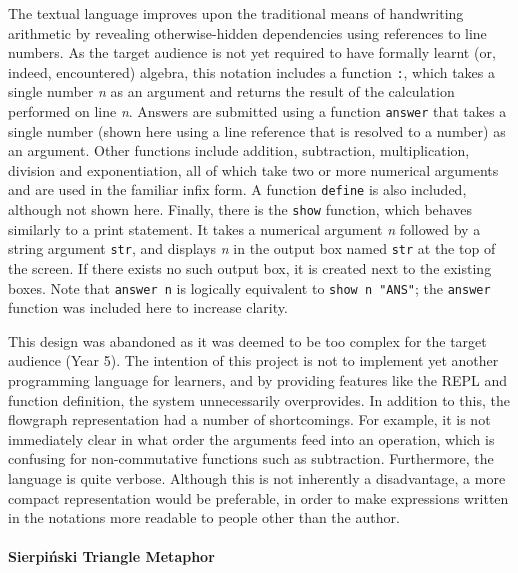 \documentclass[12pt,twoside,notitlepage,xetex]{report}
\begin{document}
The textual language improves upon the traditional means of handwriting
arithmetic by revealing otherwise-hidden dependencies using references to line
numbers.  As the target audience is not yet required to have formally learnt
(or, indeed, encountered) algebra, this notation includes a function \verb¬:¬,
which takes a single number \emph{n} as an argument and returns the result of the
calculation performed on line \emph{n}.  Answers are submitted using a function
\verb¬answer¬ that takes a single number (shown here using a line reference that
is resolved to a number) as an argument.  Other functions include addition,
subtraction, multiplication, division and exponentiation, all of which take two
or more numerical arguments and are used in the familiar infix form.  A function
\verb¬define¬ is also included, although not shown here.  Finally, there is the
\verb¬show¬ function, which behaves similarly to a print statement.  It takes a
numerical argument \emph{n} followed by a string argument \verb¬str¬, and
displays \emph{n} in the output box named \verb¬str¬ at the top of the screen.
If there exists no such output box, it is created next to the existing boxes.
Note that \verb¬answer n¬ is logically equivalent to \verb¬show n "ANS"¬; the
\verb¬answer¬ function was included here to increase clarity.

This design was abandoned as it was deemed to be too complex for the target
audience (Year 5).  The intention of this project is not to implement yet
another programming language for learners, and by providing features like the
REPL and function definition, the system unnecessarily overprovides.  In
addition to this, the flowgraph representation had a number of shortcomings.
For example, it is not immediately clear in what order the arguments feed into
an operation, which is confusing for non-commutative functions such as
subtraction.  Furthermore, the language is quite verbose.  Although this is not
inherently a disadvantage, a more compact representation would be preferable,
in order to make expressions written in the notations more readable to people
other than the author.

\paragraph{Sierpiński Triangle Metaphor}\hfill
\end{document}

